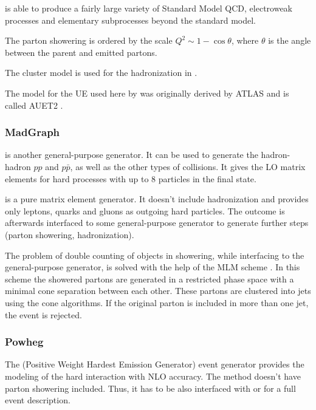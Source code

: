 \HERWIG is able to produce a fairly large variety of Standard Model QCD, electroweak processes and elementary subprocesses beyond the standard model.

The parton showering is ordered by the scale $Q^{2} \sim 1 - \cos\theta$, where $\theta$ is the angle between the parent and emitted partons.

The cluster model is used for the hadronization in \HERWIG.

The model for the UE used here by \HERWIG was originally derived by ATLAS and is called AUET2 \cite{ATL-PHYS-PUB-2011-009}.

\subsubsection{MadGraph}

\MG is another general-purpose generator. It can be used to generate the hadron-hadron $pp$ and $p\bar{p}$, as well as the other types of collisions.
It gives the LO matrix elements for hard processes with up to 8 particles in the final state. 

\MG is a pure matrix element generator. It doesn't include hadronization and provides only leptons, quarks and gluons as outgoing hard particles. 
The outcome is afterwards interfaced to some general-purpose generator to generate further steps (parton showering, hadronization). 

The problem of double counting of objects in showering, while interfacing \MG to the general-purpose generator, is solved with the help of the 
MLM scheme \cite{Mrenna:2003if}. In this scheme the showered partons are generated in a restricted phase space with a minimal cone separation
between each other. These partons are clustered into jets using the cone algorithms. If the original parton is included in more than one jet,
the event is rejected.

\subsubsection{Powheg}

The \Powheg (Positive Weight Hardest Emission Generator) event generator \cite{Frixione:2007vw} provides the modeling of the hard interaction 
with NLO accuracy. The \Powheg method doesn't have parton showering included. Thus, it has to be also interfaced with \PYTHIA or
\HERWIG for a full event description.

